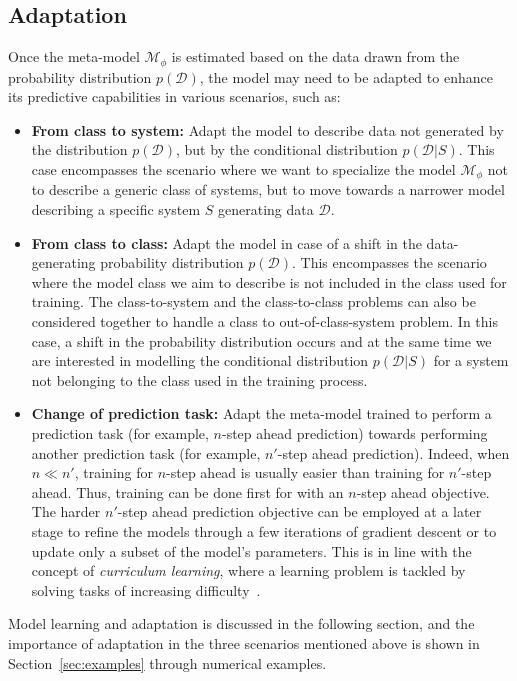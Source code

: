 \documentclass{ifacconf}
\newcommand{\sys}{S}
\newcommand{\free}{\mathcal{M}}
\newcommand{\D}{\mathcal{D}}
\begin{document}
\subsection{Adaptation}
Once the meta-model $\free_{\phi}$ is estimated based on the data drawn from the probability distribution $p(\D)$, the model may need to be adapted to enhance its predictive capabilities in various scenarios, such as: 

\begin{itemize}
    \item \textbf{From class to  system:} Adapt the model to describe data not generated by the  distribution $p(\D)$, but by the conditional distribution $p(\D|\sys)$. This case encompasses the scenario where we want to specialize the model $\free_{\phi}$ not to describe a generic class of systems, but to move towards a narrower model describing a specific system $\sys$ generating data $\D$.
    
    \item \textbf{From class to class:} Adapt the model in case of a shift in the data-generating probability distribution $p(\D)$. This encompasses the scenario where the model class we aim to describe is not included in the class used for training. The class-to-system and the class-to-class problems can also be considered together  to handle a class to out-of-class-system problem. In this case, a shift in the probability distribution occurs and at the same time  we are interested in modelling the conditional distribution $p(\D|\sys)$ for a system not belonging to the class used in the training process.
    
    \item \textbf{Change of prediction task:} Adapt the meta-model trained  to perform a prediction task (for example, $n$-step ahead prediction) towards performing another prediction task (for example, $n'$-step ahead prediction). Indeed, when $n \ll n'$, training for $n$-step ahead is usually easier than training for $n'$-step ahead. Thus, training can be done first for with an $n$-step ahead objective. The harder $n'$-step ahead prediction objective can be employed at a later stage to refine the models through a few iterations of gradient descent or to update only a subset of the model's parameters. This is in line with the concept of \emph{curriculum learning}, where a learning problem is tackled by solving tasks of increasing difficulty~\citep{wang2021survey}.
\end{itemize}

Model learning and adaptation is discussed in the following section, and the importance of adaptation in the three scenarios mentioned above is shown in Section~\ref{sec:examples} through numerical examples.
\end{document}
